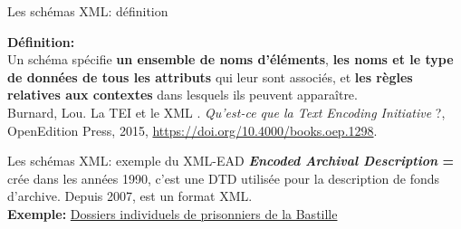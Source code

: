\begin{frame}{Les schémas XML: définition}
\begin{block}{}
\textbf{Définition:}\\
    \small{
    \og Un schéma spécifie \textbf{un ensemble de noms d'éléments}, \textbf{les noms et le type de données de tous les attributs} qui leur sont associés, et \textbf{les règles relatives aux contextes} dans lesquels ils peuvent apparaître.\fg{}}\\
    Burnard, Lou. \og La TEI et le XML \fg. \textit{Qu'est-ce que la Text Encoding Initiative }?, OpenEdition Press, 2015, \url{https://doi.org/10.4000/books.oep.1298}.
\end{block}
    
\end{frame}

\begin{frame}{Les schémas XML: exemple du XML-EAD}
    \textbf{\textit{Encoded Archival Description} =} crée dans les années 1990, c'est une DTD utilisée pour la description de fonds d'archive. Depuis 2007, est un format XML.\\
     \textbf{Exemple:} \href{https://ccfr.bnf.fr/portailccfr/servlet/ViewManager?menu=public_menu_view&record=eadbam:EADC:d0e1129770_FRBNFEAD0000129462&setCache=all_simple.PUBLIC_CATALOGUE_SIMPLE_MULTI&fromList=true&source=all_simple&action=public_search_federated&query=PUBLIC_CATALOGUE_SIMPLE}{Dossiers individuels de prisonniers de la Bastille}
\end{frame}


